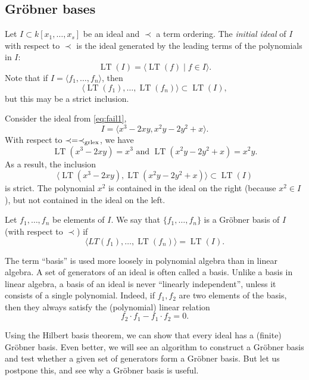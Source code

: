 \documentclass[11pt]{article}
\DeclareMathOperator{\LT}{LT}
\begin{document}
\subsection{Gr\"obner bases}
Let $I \subset k[x_1,\dots, x_s]$ be an ideal and $\prec$ a term ordering.
The \emph{initial ideal} of $I$ with respect to $\prec$ is the ideal generated by the leading terms of the polynomials in $I$:
\[
  \LT(I) = \langle  \LT(f) \mid f \in I \rangle.
\]
Note that if $I = \langle  f_1, \dots, f_n \rangle$, then
\[ \langle \LT(f_1), \dots, \LT(f_n) \rangle \subset \LT(I),\]
but this may be a strict inclusion.
\begin{example}
  Consider the ideal from \autoref{eq:fail1},
  \[ I = \langle  x^3-2xy, x^2y-2y^2+x \rangle.\]
  With respect to $\prec = \prec_{\rm grlex}$, we have
  \[ \LT(x^3-2xy) = x^3 \text{ and } \LT(x^2y-2y^2+x) = x^2y.\]
  As a result, the inclusion
  \[ \langle \LT(x^3-2xy) , \LT(x^2y-2y^2+x) \rangle \subset \LT(I)\]
  is strict.
  The polynomial $x^2$ is contained in the ideal on the right (because $x^2 \in I$), but not contained in the ideal on the left.  
\end{example}
\begin{definition}
  Let $f_1, \dots, f_n$ be elements of $I$.
  We say that $\{f_1, \dots, f_n\}$ is a Gr\"obner basis of $I$ (with respect to $\prec$) if
  \[ \langle  LT(f_1), \dots, \LT(f_n) \rangle = \LT(I).\]
\end{definition}
\begin{remark}
  The term ``basis'' is used more loosely in polynomial algebra than in linear algebra.
  A set of generators of an ideal is often called a basis.
  Unlike a basis in linear algebra, a basis of an ideal is never ``linearly independent'', unless it consists of a single polynomial.
  Indeed, if $f_1, f_2$ are two elements of the basis, then they always satisfy the (polynomial) linear relation
  \[ f_2 \cdot f_1 - f_1 \cdot f_2 = 0.\]
\end{remark}
Using the Hilbert basis theorem, we can show that every ideal has a (finite) Gr\"obner basis.
Even better, we will see an algorithm to construct a Gr\"obner basis and test whether a given set of generators form a Gr\"obner basis.
But let us postpone this, and see why a Gr\"obner basis is useful.
\end{document}
